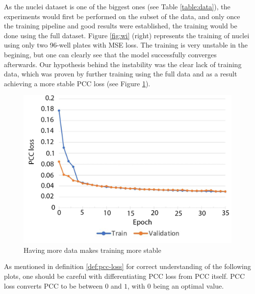 

As the nuclei dataset is one of the biggest ones (see Table \ref{table:data}), the experiments would first be performed on the subset of the data, and only once the training pipeline and good results were established, the training would be done using the full dataset. Figure \ref{fig:wi} (right) represents the training of nuclei using only two 96-well plates with MSE loss. The training is very unstable in the begining, but one can clearly see that the model successfully converges afterwards. Our hypothesis behind the instability was the clear lack of training data, which was proven by further training using the full data and as a result achieving a more stable PCC loss (see Figure \ref{fig:full-dataset-pcc}).

\begin{figure}[htb]
	\begin{center}
		\includegraphics[width=0.5\linewidth]{bilder/nuclei/full-dataset.png}
		\caption{Having more data makes training more stable}\label{fig:full-dataset-pcc}
	\end{center}
\end{figure}

As mentioned in definition \ref{def:pcc-loss} for correct understanding of the following plots, one should be careful with differentiating PCC loss from PCC itself. PCC loss converts PCC to be between $0$ and $1$, with $0$ being an optimal value.

